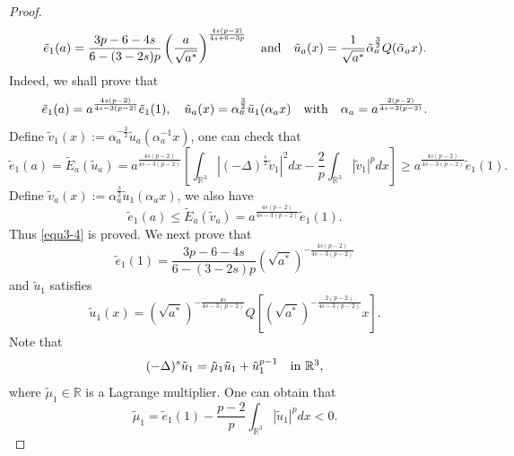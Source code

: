 \documentclass[reqno, 11pt]{amsart} %
\numberwithin{equation}{section}
\begin{document}
\begin{proof}
		\begin{equation}\label{equ3-3}
			\tilde{e}_{1}(a)=\frac{3p-6-4s}{6-(3-2s)p}\left(\frac{a}{\sqrt{a^{\ast}}}\right)^{\frac{4s(p-2)}{4s+6-3p}}\quad \hbox{and}\quad \tilde{u}_{a}(x)=\frac{1}{\sqrt{a^{\ast}}}\tilde{\alpha}_{a}^{\frac{3}{2}}Q(\tilde{\alpha}_{a}x).
		\end{equation}
		Indeed, we shall prove that
		\begin{equation}\label{equ3-4}
			\tilde{e}_{1}(a)=a^{\frac{4s(p-2)}{4s-3(p-2)}}\tilde{e}_{1}(1),\quad \tilde{u}_{a}(x)=\alpha_{a}^{\frac{3}{2}}\tilde{u}_{1}(\alpha_{a}x)\quad \hbox{with}\quad \alpha_{a}=a^{\frac{2(p-2)}{4s-3(p-2)}}.
		\end{equation}
		Define $\tilde{v}_{1}(x):=\alpha_{a}^{-\frac{3}{2}}\tilde{u}_{a}(\alpha_{a}^{-1}x)$, one can check that
		\begin{equation*}
			\tilde{e}_{1}(a)=\tilde{E}_{a}(\tilde{u}_{a})=a^{\frac{4s(p-2)}{4s-3(p-2)}}\left[\int_{\mathbb{R}^{3}}|(-\Delta)^{\frac{s}{2}}\tilde{v}_{1}|^{2}dx-\frac{2}{p}\int_{\mathbb{R}^{3}}|\tilde{v}_{1}|^{p}dx\right]\geq a^{\frac{4s(p-2)}{4s-3(p-2)}}\tilde{e}_{1}(1).
		\end{equation*}
		Define $\tilde{v}_{a}(x):=\alpha_{a}^{\frac{3}{2}}\tilde{u}_{1}(\alpha_{a}x)$, we also have
		\begin{equation*}
			\tilde{e}_{1}(a)\leq\tilde{E}_{a}(\tilde{v}_{a})=a^{\frac{4s(p-2)}{4s-3(p-2)}}\tilde{e}_{1}(1).
		\end{equation*}
		Thus \eqref{equ3-4} is proved. We next prove that
		\begin{equation}\label{equ3-5}
			\tilde{e}_{1}(1)=\frac{3p-6-4s}{6-(3-2s)p}(\sqrt{a^{\ast}})^{-\frac{4s(p-2)}{4s-3(p-2)}}
		\end{equation}
		and $\tilde{u}_{1}$ satisfies
		\begin{equation}\label{equ3-6}
			\tilde{u}_{1}(x)=(\sqrt{a^{\ast}})^{-\frac{4s}{4s-3(p-2)}}Q\left[(\sqrt{a^{\ast}})^{-\frac{2(p-2)}{4s-3(p-2)}}x\right].
		\end{equation}
		Note that
		\begin{equation*}
			(-\Delta)^{s}\tilde{u}_{1}=\tilde{\mu}_{1}\tilde{u}_{1}+\tilde{u}_{1}^{p-1}\quad\hbox{in $\mathbb{R}^3$},
		\end{equation*}
		where $\tilde{\mu}_{1}\in\mathbb{R}$ is a Lagrange multiplier. One can obtain that
		\begin{equation*}
			\tilde{\mu}_{1}=\tilde{e}_{1}(1)-\frac{p-2}{p}\int_{\mathbb{R}^{3}}|\tilde{u}_{1}|^{p}dx<0.
		\end{equation*}

\end{proof}
\end{document}
